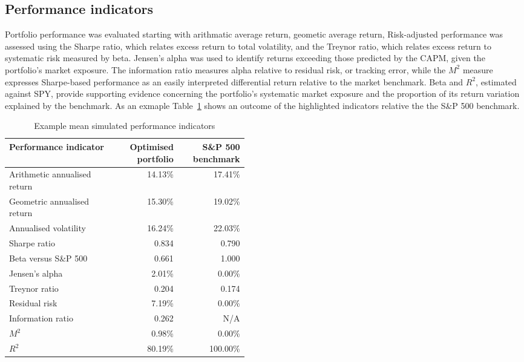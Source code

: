 \documentclass[11pt,a4paper]{article}
\begin{document}
\subsection{Performance indicators}

Portfolio performance was evaluated starting with arithmatic average return, geometic average return, Risk-adjusted performance was assessed using the Sharpe ratio, which relates excess return to total volatility, and the Treynor ratio, which relates excess return to systematic risk measured by beta. Jensen’s alpha was used to identify returns exceeding those predicted by the CAPM, given the portfolio’s market exposure. The information ratio measures alpha relative to residual risk, or tracking error, while the \(M^2\) measure expresses Sharpe-based performance as an easily interpreted differential return relative to the market benchmark. Beta and \(R^2\), estimated against SPY, provide supporting evidence concerning the portfolio’s systematic market exposure and the proportion of its return variation explained by the benchmark. As an exmaple Table~\ref{tab:performance-indicator-example} shows an outcome of the highlighted indicators relative the the S\&P 500 benchmark.

\begin{table}[H]
  \centering
  \small
  \caption{Example mean simulated performance indicators}
  \label{tab:performance-indicator-example}
  \begin{tabular}{p{0.46\linewidth}rr}
    \toprule
    Performance indicator & Optimised portfolio & S\&P 500 benchmark \\
    \midrule
    Arithmetic annualised return & 14.13\% & 17.41\% \\
    Geometric annualised return & 15.30\% & 19.02\% \\
    Annualised volatility & 16.24\% & 22.03\% \\
    Sharpe ratio & 0.834 & 0.790 \\
    Beta versus S\&P 500 & 0.661 & 1.000 \\
    Jensen's alpha & 2.01\% & 0.00\% \\
    Treynor ratio & 0.204 & 0.174 \\
    Residual risk & 7.19\% & 0.00\% \\
    Information ratio & 0.262 & N/A \\
    $M^2$ & 0.98\% & 0.00\% \\
    $R^2$ & 80.19\% & 100.00\% \\
    \bottomrule
  \end{tabular}
\end{table}
\end{document}
